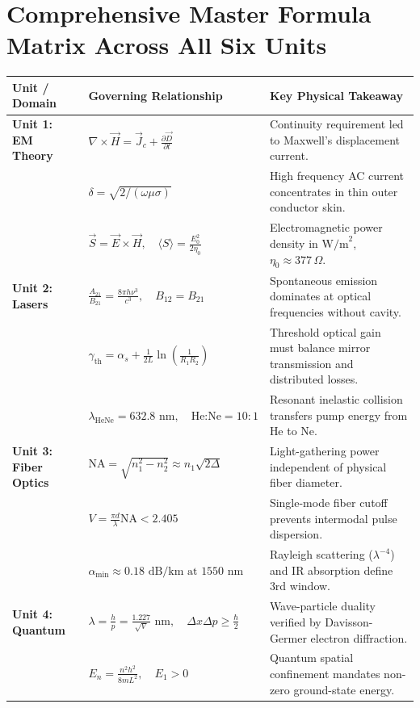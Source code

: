 \section{Comprehensive Master Formula Matrix Across All Six Units}
\begin{center}
\small
\begin{tabularx}{\textwidth}{l X X}
\toprule
\textbf{Unit / Domain} & \textbf{Governing Relationship} & \textbf{Key Physical Takeaway} \\
\midrule
\textbf{Unit 1: EM Theory} & $\nabla \times \vec{H} = \vec{J}_c + \frac{\partial \vec{D}}{\partial t}$ & Continuity requirement led to Maxwell's displacement current. \\
& $\delta = \sqrt{2/(\omega\mu\sigma)}$ & High frequency AC current concentrates in thin outer conductor skin. \\
& $\vec{S} = \vec{E} \times \vec{H}, \quad \langle S \rangle = \frac{E_0^2}{2\eta_0}$ & Electromagnetic power density in $\text{W/m}^2$, $\eta_0 \approx 377\,\Omega$. \\
\midrule
\textbf{Unit 2: Lasers} & $\frac{A_{21}}{B_{21}} = \frac{8\pi h \nu^3}{c^3}, \quad B_{12} = B_{21}$ & Spontaneous emission dominates at optical frequencies without cavity. \\
& $\gamma_{\text{th}} = \alpha_s + \frac{1}{2L}\ln\left(\frac{1}{R_1 R_2}\right)$ & Threshold optical gain must balance mirror transmission and distributed losses. \\
& $\lambda_{\text{HeNe}} = 632.8\text{ nm}, \quad \text{He:Ne} = 10:1$ & Resonant inelastic collision transfers pump energy from He to Ne. \\
\midrule
\textbf{Unit 3: Fiber Optics} & $\text{NA} = \sqrt{n_1^2 - n_2^2} \approx n_1\sqrt{2\Delta}$ & Light-gathering power independent of physical fiber diameter. \\
& $V = \frac{\pi d}{\lambda}\text{NA} < 2.405$ & Single-mode fiber cutoff prevents intermodal pulse dispersion. \\
& $\alpha_{\text{min}} \approx 0.18\text{ dB/km at } 1550\text{ nm}$ & Rayleigh scattering ($\lambda^{-4}$) and IR absorption define 3rd window. \\
\midrule
\textbf{Unit 4: Quantum} & $\lambda = \frac{h}{p} = \frac{1.227}{\sqrt{V}}\text{ nm}, \quad \Delta x \Delta p \ge \frac{\hbar}{2}$ & Wave-particle duality verified by Davisson-Germer electron diffraction. \\
& $E_n = \frac{n^2 h^2}{8mL^2}, \quad E_1 > 0$ & Quantum spatial confinement mandates non-zero ground-state energy. \\

\end{tabularx}
\end{center}
